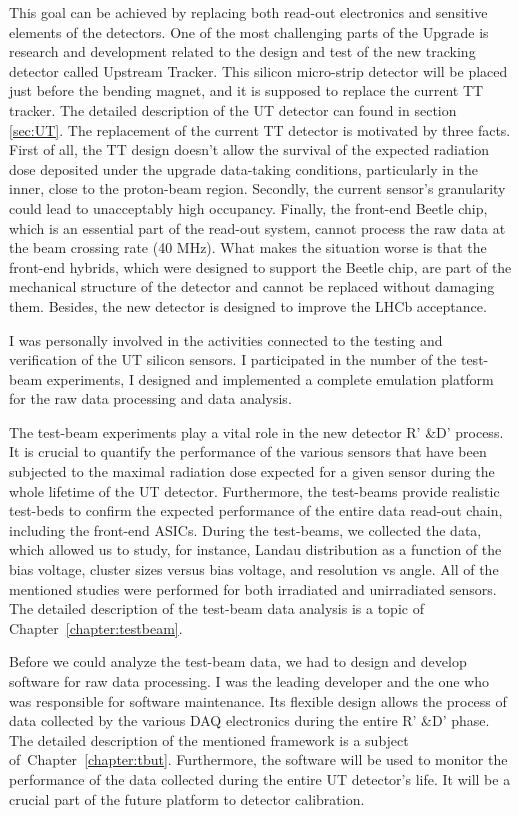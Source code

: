 This goal can be achieved by replacing both read-out electronics and sensitive elements of the detectors. One of the most challenging parts of the Upgrade is research and development related to the design and test of the new tracking detector called Upstream Tracker. This silicon micro-strip detector will be placed just before the bending magnet, and it is supposed to replace the current TT tracker. The detailed description of the UT detector can found in section \ref{sec:UT}.  The replacement of the current TT detector is motivated by three facts. First of all, the TT design doesn't allow the survival of the expected radiation dose deposited under the upgrade data-taking conditions, particularly in the inner, close to the proton-beam region. Secondly, the current sensor's granularity could lead to unacceptably high occupancy. Finally, the front-end Beetle chip, which is an essential part of the read-out system, cannot process the raw data at the beam crossing rate (40 MHz). What makes the situation worse is that the front-end hybrids, which were designed to support the Beetle chip, are part of the mechanical structure of the detector and cannot be replaced without damaging them. Besides, the new detector is designed to improve the LHCb acceptance. 

I was personally involved in the activities connected to the testing and verification of the UT silicon sensors. I participated in the number of the test-beam experiments, I designed and implemented a complete emulation platform for the raw data processing and data analysis. 

The test-beam experiments play a vital role in the new detector R' \&D' process. It is crucial to quantify the performance of the various sensors that have been subjected to the maximal radiation dose expected for a given sensor during the whole lifetime of the UT detector. Furthermore, the test-beams provide realistic test-beds to confirm the expected performance of the entire data read-out chain, including the front-end ASICs. During the test-beams, we collected the data, which allowed us to study, for instance, Landau distribution as a function of the bias voltage, cluster sizes versus bias voltage, and resolution vs angle. All of the mentioned studies were performed for both irradiated and unirradiated sensors. The detailed description of the test-beam data analysis is a topic of Chapter~\ref{chapter:testbeam}.

Before we could analyze the test-beam data, we had to design and develop software for raw data processing. I was the leading developer and the one who was responsible for software maintenance.  Its flexible design allows the process of data collected by the various DAQ electronics during the entire R' \&D' phase. The detailed description of the mentioned framework is a subject of~Chapter~\ref{chapter:tbut}. Furthermore, the software will be used to monitor the performance of the data collected during the entire UT detector's life. It will be a crucial part of the future platform to detector calibration. 

